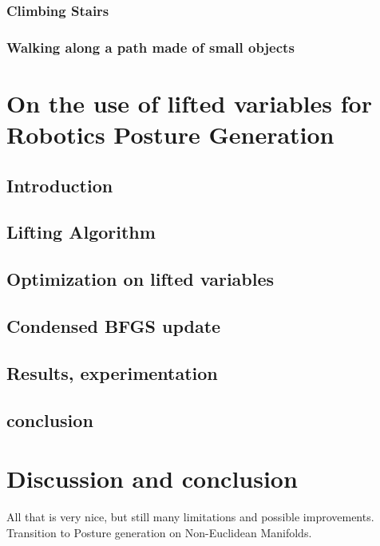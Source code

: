 \subsubsection{Climbing Stairs}
\subsubsection{Walking along a path made of small objects}


\section{On the use of lifted variables for Robotics Posture Generation}
\label{sec:liftedVariables}

\subsection{Introduction}
\label{subsec:Introduction}

\subsection{Lifting Algorithm}
\label{subsec:LiftingAlgorithm}

\subsection{Optimization on lifted variables}
\label{subsec:Optimization on lifted variables}

\subsection{Condensed BFGS update}
\label{subsec:Condensed BFGS update}

\subsection{Results, experimentation}
\label{subsec:Results}

\subsection{conclusion}
\label{subsec:conclusion}


\section{Discussion and conclusion}
All that is very nice, but still many limitations and possible improvements.
Transition to Posture generation on Non-Euclidean Manifolds.



